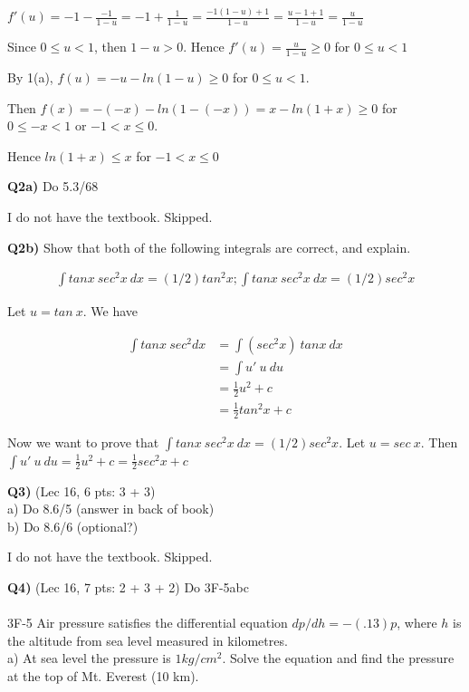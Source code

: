\documentclass[9pt]{article}
\begin{document}
$f'(u) = -1 - \frac{-1}{1 - u} = -1 + \frac{1}{1-u} = \frac{-1(1-u) + 1}{1 - u} = \frac{u - 1 + 1}{1 - u} = \frac{u}{1 - u}$

Since $0 \leq u < 1$, then $1 - u > 0$. Hence $f'(u) = \frac{u}{1 - u} \geq 0$ for $0 \leq u < 1$

By 1(a), $f(u) = -u - ln(1 - u) \geq 0$ for $0 \leq u < 1$.

Then $f(x) = -(-x) - ln(1 - (-x)) = x - ln(1 + x) \geq 0$ for $0 \leq -x < 1$ or $-1 < x \leq 0$.

Hence $ln(1 + x) \leq x$ for $-1 < x \leq 0$


\begin{tcolorbox}
  \textbf{Q2a)} Do 5.3/68
\end{tcolorbox}

I do not have the textbook. Skipped.


\begin{tcolorbox}
  \textbf{Q2b)} Show that both of the following integrals are correct, and explain.

  \begin{align*}
    \int tan x\ sec^2 x\ dx = (1/2) tan^2 x; \int tan x\ sec^2 x\ dx = (1/2) sec^2 x
  \end{align*}
\end{tcolorbox}

Let $u = tan\ x$. We have

\begin{align*}
  \int tan x\ sec^2 dx &= \int (sec^2 x)\ tan x\ dx \\
                       &= \int u'\ u\ du \\
                       &= \frac{1}{2} u^2 + c \\
                       &= \frac{1}{2} tan^2 x + c
\end{align*}

Now we want to prove that $\int tan x\ sec^2 x\ dx = (1/2) sec^2 x$. Let $u = sec\ x$. Then $\int u' \ u\ du = \frac{1}{2}u^2 + c = \frac{1}{2} sec^2 x + c$


\begin{tcolorbox}
  \textbf{Q3)} (Lec 16, 6 pts: 3 + 3)\\
  a) Do 8.6/5 (answer in back of book)\\
  b) Do 8.6/6 (optional?)
\end{tcolorbox}

I do not have the textbook. Skipped.


\begin{tcolorbox}
  \textbf{Q4)} (Lec 16, 7 pts: 2 + 3 + 2) Do 3F-5abc\\
  \\
  3F-5 Air pressure satisfies the differential equation $dp/dh = -(.13)p$, where $h$ is the altitude from sea level measured in kilometres.\\
  a) At sea level the pressure is $1kg/cm^2$. Solve the equation and find the pressure at the top of Mt. Everest (10 km).
\end{tcolorbox}
\end{document}

